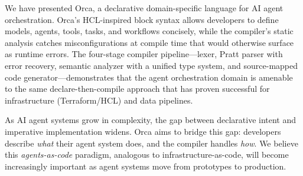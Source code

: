 \documentclass[sigconf,nonacm]{acmart}
\begin{document}
We have presented Orca, a declarative domain-specific language for AI
agent orchestration. Orca's HCL-inspired block syntax allows developers
to define models, agents, tools, tasks, and workflows concisely, while
the compiler's static analysis catches misconfigurations at compile time
that would otherwise surface as runtime errors. The four-stage compiler
pipeline---lexer, Pratt parser with error recovery, semantic analyzer with
a unified type system, and source-mapped code generator---demonstrates that
the agent orchestration domain is amenable to the same
declare-then-compile approach that has proven successful for infrastructure
(Terraform/HCL) and data pipelines.

As AI agent systems grow in complexity, the gap between declarative intent
and imperative implementation widens. Orca aims to bridge this gap:
developers describe \emph{what} their agent system does, and the compiler
handles \emph{how}. We believe this \emph{agents-as-code} paradigm,
analogous to infrastructure-as-code, will become increasingly important as
agent systems move from prototypes to production.



\end{document}

